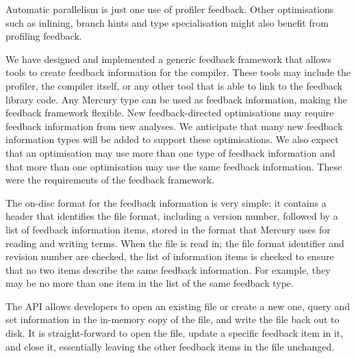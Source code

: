 Automatic parallelism is just one use of profiler feedback.
Other optimisations
such as inlining,
branch hints
and type specialisation
might also benefit from profiling feedback.

We have designed and implemented a generic feedback framework that allows
tools to create feedback information for the compiler.
These tools may include the profiler, the compiler itself,
or any other tool that is able to link to the feedback library code.
Any Mercury type can be used as feedback information,
making the feedback framework flexible.
New feedback-directed optimisations may require feedback information
from new analyses.
We anticipate that many new feedback information types will be added to
support these optimisations.
We also expect that an optimisation may use more than one type of
feedback information and that more than one optimisation may use the
same feedback information.
These were the requirements of the feedback framework.

The on-disc format for the feedback information is very simple:
it contains a header that identifies the file format,
including a version number,
followed by a list of feedback information items,
stored in the format that Mercury uses for reading and writing
terms.
When the file is read in;
the file format identifier and revision number are checked,
the list of information items is checked to ensure that no two items
describe the same feedback information.
For example,
they may be no more than one item in the list of the same feedback type.

The API allows developers to open an existing file or create a new one,
query and set information in the in-memory copy of the file,
and write the file back out to disk.
It is straight-forward to open the file,
update a specific feedback item in it,
and close it,
essentially leaving the other feedback items in the file unchanged.



